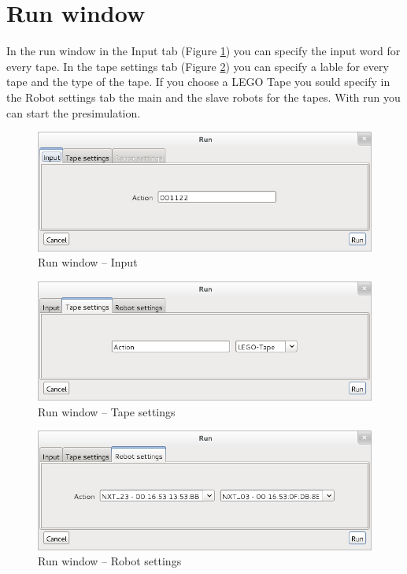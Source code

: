 \documentclass[%
  a4paper,%
  11pt,%
  blue,%
  hyperref	%
  ]{tubsartcl}
\begin{document}
\newpage

\section{Run window}
In the run window in the Input tab (Figure \ref{pic:run_window_input}) you can specify the input word for every tape. In the tape settings tab (Figure \ref{pic:run_window_tape_settings}) you can specify a lable for every tape and the type of the tape. If you choose a LEGO Tape you sould specify in the Robot settings tab the main and the slave robots for the tapes. With run you can start the presimulation.
\begin{figure}[!htb]
\begin{center}
\includegraphics[scale=0.5]{graphics_gui/run_window_input.png}
\end{center}
\caption{Run window -- Input}
\label{pic:run_window_input}
\end{figure}


\begin{figure}[!htb]
\begin{center}
\includegraphics[scale=0.5]{graphics_gui/run_window_tape_settings.png}
\end{center}
\caption{Run window -- Tape settings}
\label{pic:run_window_tape_settings}
\end{figure}


\begin{figure}[!htb]
\begin{center}
\includegraphics[scale=0.5]{graphics_gui/run_window_robot_settings.png}
\end{center}
\caption{Run window -- Robot settings}
\label{pic:run_window_robot_settings}
\end{figure}
 
\end{document}
